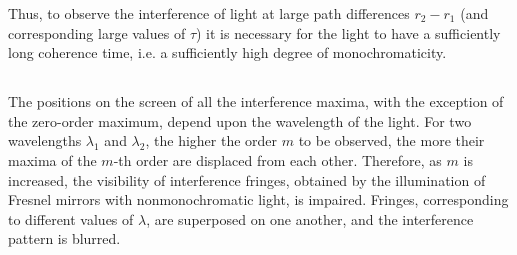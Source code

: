 Thus, to observe the interference of light at large path differences $r_{2} - r_{1}$ (and corresponding large values of $\tau$) it is necessary for the light to have a sufficiently long coherence time, i.e. a sufficiently high degree of monochromaticity.

\subsection{}\label{32.2.5} The positions on the screen of all the interference maxima, with the exception of the zero-order maximum, depend upon the wavelength of the light. For two wavelengths $\lambda_{1}$ and $\lambda_{2}$, the higher the order $m$ to be observed, the more their maxima of the $m$-th order are displaced from each other. Therefore, as $m$ is
increased, the visibility of interference fringes, obtained by the illumination of Fresnel mirrors with nonmonochromatic light, is impaired. Fringes, corresponding to different values of $\lambda$, are superposed on one another, and the interference pattern is blurred.


